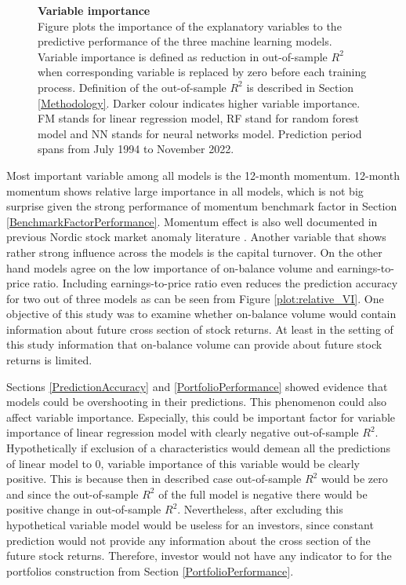 \documentclass[12pt]{article}
\begin{document}
\begin{figure}[ht]
\centering
\caption[Variable importance]{\textbf{Variable importance}\\ Figure plots the importance of the explanatory variables to the predictive performance of the three machine learning models. Variable importance is defined as reduction in out-of-sample $R^2$ when corresponding variable is replaced by zero before each training process. Definition of the out-of-sample $R^2$ is described in Section \ref{Methodology}. Darker colour indicates higher variable importance. FM stands for linear regression model, RF stand for random forest model and NN stands for neural networks model. Prediction period spans from July 1994 to November 2022.}

\label{plot:combined_VI}
\end{figure}

Most important variable among all models is the 12-month momentum. 12-month momentum shows relative large importance in all models, which is not big surprise given the strong performance of momentum benchmark factor in Section \ref{BenchmarkFactorPerformance}. Momentum effect is also well documented in previous Nordic stock market anomaly literature  \citep[e.g.][]{grobys, leivo2011}. Another variable that shows rather strong influence across the models is the capital turnover.  On the other hand models agree on the low importance of on-balance volume and earnings-to-price ratio. Including earnings-to-price ratio even reduces the prediction accuracy for two out of three models as can be seen from Figure \ref{plot:relative_VI}. One objective of this study was to examine whether on-balance volume would contain information about future cross section of stock returns. At least in the setting of this study information that on-balance volume can provide about future stock returns is limited. \par

Sections \ref{PredictionAccuracy} and \ref{PortfolioPerformance} showed evidence that models could be overshooting in their predictions. This phenomenon could also affect variable importance. Especially, this could be important factor for variable importance of linear regression model with clearly negative out-of-sample $R^2$. Hypothetically if exclusion of a characteristics would demean all the predictions of linear model to 0, variable importance of this variable would be clearly positive. This is because then in described case out-of-sample $R^2$ would be zero and since the out-of-sample $R^2$ of the full model is negative there would be positive change in out-of-sample $R^2$. Nevertheless, after excluding this hypothetical variable model would be useless for an investors, since constant prediction would not provide any information about the cross section of the future stock returns. Therefore, investor would not have any indicator to for the portfolios construction from Section \ref{PortfolioPerformance}. \par
\end{document}
